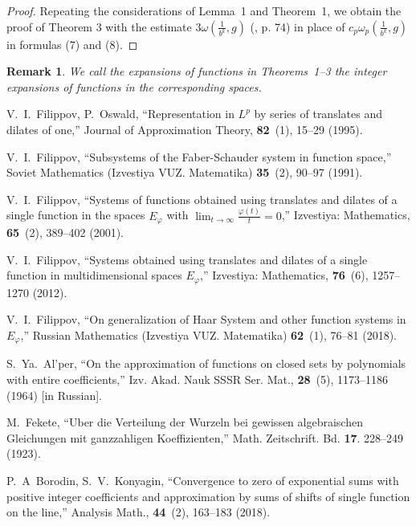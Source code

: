 \documentclass[
11pt,%
tightenlines,%
twoside,%
onecolumn,%
nofloats,%
nobibnotes,%
nofootinbib,%
superscriptaddress,%
noshowpacs,%
centertags]%
{revtex4}
\newtheorem{remark}{Remark}
\begin{document}
\begin{proof}
     Repeating the considerations  of Lemma~1 and
Theorem~1, we obtain the proof of Theorem 3 with the estimate  $ 3
\omega\left( \frac{1}{b^{k}}, g\right)  $ (\cite {ks}, p. 74) in
place of $ c_p \omega_p\left( \frac{1}{b^{k}}, g\right)  $ in
formulas (7)  and (8).
\end{proof}
\begin{remark}
  We call the  expansions of  functions in
Theorems~1--3 the {\it  integer expansions} of functions in the
corresponding spaces.
\end{remark}



\begin{thebibliography}{99}

 V.~I.~Filippov, P.~Oswald, ``Representation in
$L^p$ by series of translates and dilates of one,''  Journal of
Approximation Theory, \textbf{ 82}~(1), 15--29 (1995).

V.~I.~Filippov, ``Subsystems of the Faber-Schauder system in
function space,'' Soviet Mathematics (Izvestiya VUZ. Matematika)
\textbf{35}~(2), 90--97 (1991).

V.~I.~Filippov, ``Systems of functions obtained using translates
and dilates of a single function in the spaces  $ E_{\varphi}$
with  $ \lim_{t\to \infty}\frac{\varphi(t)}{t}=0$,'' Izvestiya:
Mathematics, \textbf{65}~(2), 389--402 (2001).

V.~I.~Filippov,  ``Systems obtained using translates and dilates
of a single function in multidimensional spaces $ E_{\varphi}$,''
Izvestiya: Mathematics, \textbf{76}~(6), 1257--1270 (2012).


V.~I.~Filippov, ``On generalization  of Haar System and other
function systems in $ E_{\varphi}$,'' Russian Mathematics
(Izvestiya VUZ. Matematika) \textbf{62}~(1), 76--81 (2018).

S.~Ya.~Al'per, ``On  the approximation of functions on closed sets
by polynomials with entire coefficients,'' Izv. Akad. Nauk SSSR
Ser. Mat., \textbf{28}~(5), 1173--1186 (1964) [in Russian].

M.~Fekete, ``Uber die Verteilung der Wurzeln bei gewissen algebraischen Gleichungen
mit ganzzahligen Koeffizienten,''  Math. Zeitschrift.  Bd.\textbf{ 17}. 228--249 (1923).

P.~A~Borodin, S.~V.~Konyagin, ``Convergence to zero of exponential
sums with positive integer coefficients and approximation by sums
of shifts of single function on the line,'' Analysis Math.,
\textbf{44}~(2), 163--183 (2018).


\end{thebibliography}
\end{document}
